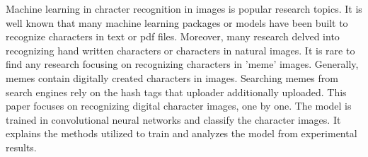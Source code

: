 Machine learning in chracter recognition in images is popular research topics. It is well known that many machine learning
packages or models have been built to recognize characters in text or pdf files. Moreover, many research delved into recognizing
hand written characters or characters in natural images. It is rare to find any research focusing on recognizing characters in
'meme' images. Generally, memes contain digitally created characters in images. Searching memes from search engines rely on the
hash tags that uploader additionally uploaded. This paper focuses on recognizing digital character images, one by one. The model
is trained in convolutional neural networks and classify the character images. It explains the methods utilized to train and
analyzes the model from experimental results.